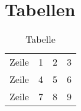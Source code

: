 \chapter{Tabellen}

\begin {table}
\center
\begin{tabular}{ l ||c  c | c }
  Zeile & 1 & 2 & 3 \\
  Zeile & 4 & 5 & 6 \\
  Zeile & 7 & 8 & 9 \\
  \hline
\end{tabular}
  \caption{Tabelle}
  \label{tab:1}
\end{table}

